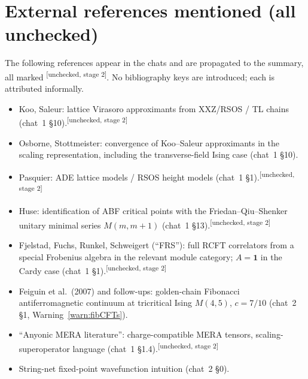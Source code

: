 \documentclass[11pt,a4paper]{article}
\theoremstyle{definition}
\newcommand{\one}{\mathbf{1}}
\newcommand{\unchecked}{\textsuperscript{\textcolor{red!70!black}{[unchecked, stage 2]}}}
\begin{document}
\section*{External references mentioned (all unchecked)}

The following references appear in the chats and are propagated to the
summary, all marked \unchecked. No bibliography keys are introduced; each is
attributed informally.
\begin{itemize}
\item Koo, Saleur: lattice Virasoro approximants from XXZ/RSOS / TL chains
      (chat~1 §10).\unchecked
\item Osborne, Stottmeister: convergence of Koo--Saleur approximants in the
      scaling representation, including the transverse-field Ising case
      (chat~1 §10).\cite{SRC-OAR-FERMIONS,SRC-OAR-WAVELETS,SRC-OSBORNE-CONTINUUM}
\item Pasquier: ADE lattice models / RSOS height models (chat~1 §1).\unchecked
\item Huse: identification of ABF critical points with the Friedan--Qiu--Shenker
      unitary minimal series $M(m, m+1)$ (chat~1 §13).\unchecked
\item Fjelstad, Fuchs, Runkel, Schweigert (``FRS''): full RCFT correlators
      from a special Frobenius algebra in the relevant module category;
      $A = \one$ in the Cardy case (chat~1 §1).\unchecked
\item Feiguin et al.\ (2007) and follow-ups: golden-chain Fibonacci
      antiferromagnetic continuum at tricritical Ising $M(4,5)$, $c = 7/10$
      (chat~2 §1, Warning~\ref{warn:fibCFTs}).\cite{SRC-GOLDEN-CHAIN}
\item ``Anyonic MERA literature'': charge-compatible MERA tensors,
      scaling-superoperator language (chat~1 §1.4).\unchecked
\item String-net fixed-point wavefunction intuition (chat~2 §0).\cite{SRC-STRING-NET}
\end{itemize}
\end{document}

